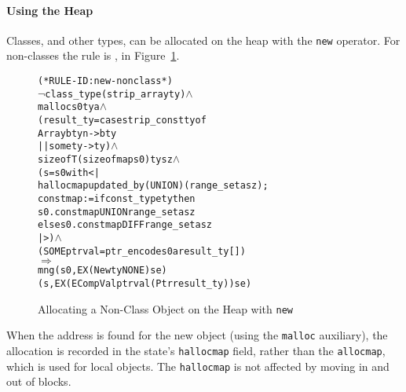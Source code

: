\documentclass[11pt]{article}
\begin{document}
\paragraph{Using the Heap}
Classes, and other types, can be allocated on the heap with the
\texttt{new} operator.  For non-classes the rule is
, in Figure~\ref{fig:new-nonclass}.
\begin{figure}[htbp]
\begin{center}
  \begin{minipage}{\textwidth}
\begin{alltt}
(* RULE-ID: new-nonclass *)
     \(\neg\)class_type (strip_array ty) \(\land\)
     malloc s0 ty a \(\land\)
     (result_ty = case strip_const ty of
                     Array bty n -> bty
                  || somety -> ty) \(\land\)
     sizeof T (sizeofmap s0) ty sz \(\land\)
     (s = s0 with <|
            hallocmap updated_by (UNION) (range_set a sz) ;
            constmap := if const_type ty then
                          s0.constmap UNION range_set a sz
                        else s0.constmap DIFF range_set a sz
          |>) \(\land\)
     (SOME ptrval = ptr_encode s0 a result_ty [])
   \(\Rightarrow\)
     mng (s0, EX (New ty NONE) se)
         (s, EX (ECompVal ptrval (Ptr result_ty)) se)
\end{alltt}
\end{minipage}
\end{center}
\caption{Allocating a Non-Class Object on the Heap with \texttt{new}}
\label{fig:new-nonclass}
\end{figure}
When the address is found for the new object (using the
\texttt{malloc} auxiliary), the allocation is recorded in the state's
\texttt{hallocmap} field, rather than the \texttt{allocmap}, which is
used for local objects.  The \texttt{hallocmap} is not affected by
moving in and out of blocks.
\end{document}
